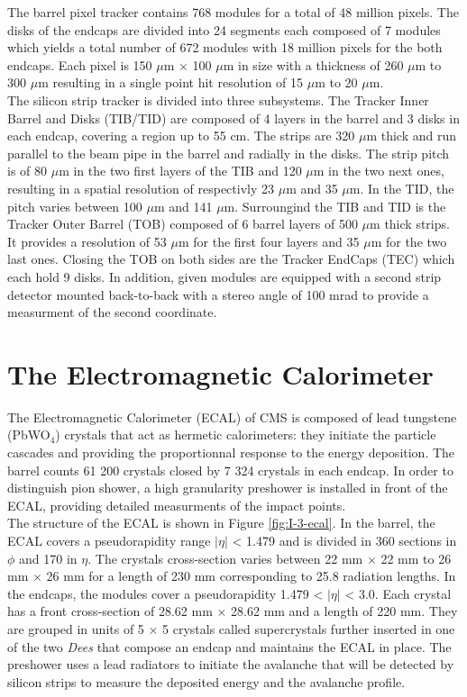     The barrel pixel tracker contains 768 modules for a total of 48 million pixels. The disks of the endcaps are divided into 24 segments each composed of 7 modules which yields a total number of 672 modules with 18 million pixels for the both endcaps. Each pixel is 150 $\mu$m $\times$ 100 $\mu$m in size with a thickness of 260 $\mu$m to 300 $\mu$m resulting in a single point hit resolution of 15 $\mu$m to 20 $\mu$m. \\

    The silicon strip tracker is divided into three subsystems. The Tracker Inner Barrel and Disks (TIB/TID) are composed of 4 layers in the barrel and 3 disks in each endcap, covering a region up to 55 cm. The strips are 320 $\mu$m thick and run parallel to the beam pipe in the barrel and radially in the disks. The strip pitch is of 80 $\mu$m in the two first layers of the TIB and 120 $\mu$m in the two next ones, resulting in a spatial resolution of respectivly 23 $\mu$m and 35 $\mu$m. In the TID, the pitch varies between 100 $\mu$m and 141 $\mu$m. Surroungind the TIB and TID is the Tracker Outer Barrel (TOB) composed of 6 barrel layers of 500 $\mu$m thick strips. It provides a resolution of 53 $\mu$m for the first four layers and 35 $\mu$m for the two last ones. Closing the TOB on both sides are the Tracker EndCaps (TEC) which each hold 9 disks. In addition, given modules are equipped with a second strip detector mounted back-to-back with a stereo angle of 100 mrad to provide a measurment of the second coordinate.

  \section{The Electromagnetic Calorimeter}

    The Electromagnetic Calorimeter (ECAL) of CMS is composed of lead tungstene (PbWO$_4$) crystals that act as hermetic calorimeters: they initiate the particle cascades and providing the proportionnal response to the energy deposition. The barrel counts 61 200 crystals closed by 7 324 crystals in each endcap. In order to distinguish pion shower, a high granularity preshower is installed in front of the ECAL, providing detailed measurments of the impact points. \\

    The structure of the ECAL is shown in Figure \ref{fig:I-3-ecal}. In the barrel, the ECAL covers a pseudorapidity range $ | \eta | $ < 1.479 and is divided in 360 sections in $ \phi $ and 170 in $ \eta $. The crystals cross-section varies between 22 mm $ \times $ 22 mm to 26 mm $ \times $ 26 mm for a length of 230 mm corresponding to 25.8 radiation lengths. In the endcaps, the modules cover a pseudorapidity 1.479 < $ | \eta | $ < 3.0. Each crystal has a front cross-section of 28.62 mm $ \times $ 28.62 mm and a length of 220 mm. They are grouped in units of 5 $ \times $ 5 crystals called supercrystals further inserted in one of the two \emph{Dees} that compose an endcap and maintains the ECAL in place. The preshower uses a lead radiators to initiate the avalanche that will be detected by silicon strips to measure the deposited energy and the avalanche profile. \\

